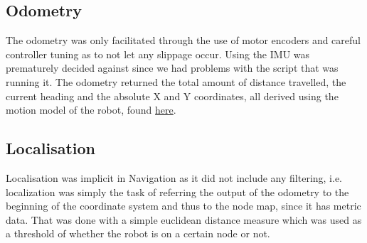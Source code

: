 \documentclass[10pt,a4paper,twocolumn]{article}
\begin{document}
\subsection{Odometry}
The odometry was only facilitated through the use of motor encoders and careful controller tuning as to not let any slippage occur. Using the IMU was prematurely decided against since we had problems with the script that was running it. 
The odometry returned the total amount of distance travelled, the current heading and the absolute X and Y coordinates, all derived using the motion model of the robot, found \href{http://goo.gl/SGA99c}{here}.
\subsection{Localisation}
Localisation was implicit in Navigation as it did not include any filtering, i.e. localization was simply the task of referring the output of the odometry to the beginning of the coordinate system and thus to the node map, since it has metric data. That was done with a simple euclidean distance measure which was used as a threshold of whether the robot is on a certain node or not. 
\end{document}
